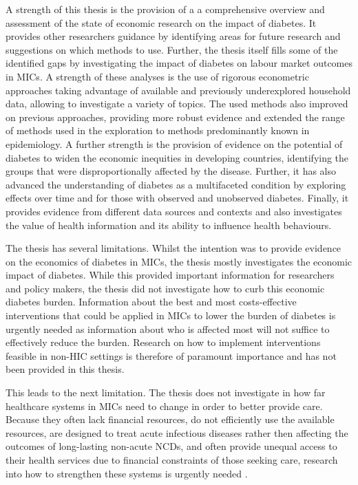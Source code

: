 A strength of this thesis is the provision of a a comprehensive overview and assessment of the state of economic research on the impact of diabetes. It provides other researchers guidance by identifying areas for future research and suggestions on which methods to use. Further, the thesis itself fills some of the identified gaps by investigating the impact of diabetes on labour market outcomes in \acp{MIC}. A strength of these analyses is the use of rigorous econometric approaches taking advantage of available and previously underexplored household data, allowing to investigate a variety of topics. The used methods also improved on previous approaches, providing more robust evidence and extended the range of methods used in the exploration to methods predominantly known in epidemiology.  A further strength is the provision of evidence on the potential of diabetes to widen the economic inequities in developing countries, identifying the groups that were disproportionally affected by the disease. Further, it has also advanced the understanding of diabetes as a multifaceted condition by exploring effects over time and for those with observed and unobserved diabetes. Finally, it provides evidence from different data sources and contexts and also investigates the value of health information and its ability to influence health behaviours.

The thesis has several limitations. Whilst the intention was to provide evidence on the economics of diabetes in \acp{MIC}, the thesis mostly investigates the economic impact of diabetes. While this provided important information for researchers and policy makers, the thesis did not investigate how to curb this economic diabetes burden. Information about the best and most costs-effective interventions that could be applied in \acp{MIC} to lower the burden of diabetes is urgently needed as information about who is affected most will not suffice to effectively reduce the burden. Research on how to implement interventions feasible in non-\ac{HIC} settings is therefore of paramount importance and has not been provided in this thesis.

This leads to the next limitation. The thesis does not investigate in how far healthcare systems in \acp{MIC} need to change in order to better provide care. Because they often lack financial resources, do not efficiently use the available resources, are designed to treat acute infectious diseases rather then affecting the outcomes of long-lasting non-acute \acp{NCD}, and often provide unequal access to their health services due to financial constraints of those seeking care, research into how to strengthen these systems is urgently needed \parencite{Mills2014,Guzman2010}.

